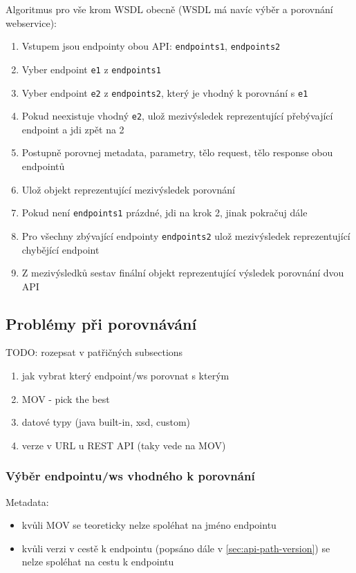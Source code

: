 \documentclass[czech,DP]{thesiskiv}
\begin{document}
Algoritmus pro vše krom WSDL obecně (WSDL má navíc výběr a porovnání webservice):
\begin{enumerate}
	\item Vstupem jsou endpointy obou API: \verb|endpoints1|, \verb|endpoints2|
	\item Vyber endpoint \verb|e1| z \verb|endpoints1|
	\item Vyber endpoint \verb|e2| z \verb|endpoints2|, který je vhodný k porovnání s \verb|e1|
	\item Pokud neexistuje vhodný \verb|e2|, ulož mezivýsledek reprezentující přebývající endpoint a jdi zpět na 2
	\item Postupně porovnej metadata, parametry, tělo request, tělo response obou endpointů
	\item Ulož objekt reprezentující mezivýsledek porovnání
	\item Pokud není \verb|endpoints1| prázdné, jdi na krok 2, jinak pokračuj dále
	\item Pro všechny zbývající endpointy \verb|endpoints2| ulož mezivýsledek reprezentující chybějící endpoint
	\item Z mezivýsledků sestav finální objekt reprezentující výsledek porovnání dvou API
\end{enumerate}

\subsection{Problémy při porovnávání}	

TODO: rozepsat v patřičných subsections
\begin{enumerate}
	\item jak vybrat který endpoint/ws porovnat s kterým
	\item MOV - pick the best
	\item datové typy (java built-in, xsd, custom)
	\item verze v URL u REST API (taky vede na MOV)
\end{enumerate}
	
\subsubsection{Výběr endpointu/ws vhodného k porovnání}

Metadata:
\begin{itemize}
	\item kvůli MOV se teoreticky nelze spoléhat na jméno endpointu
	\item kvůli verzi v cestě k endpointu (popsáno dále v \ref{sec:api-path-version}) se nelze spoléhat na cestu k endpointu
\end{itemize}
\end{document}
